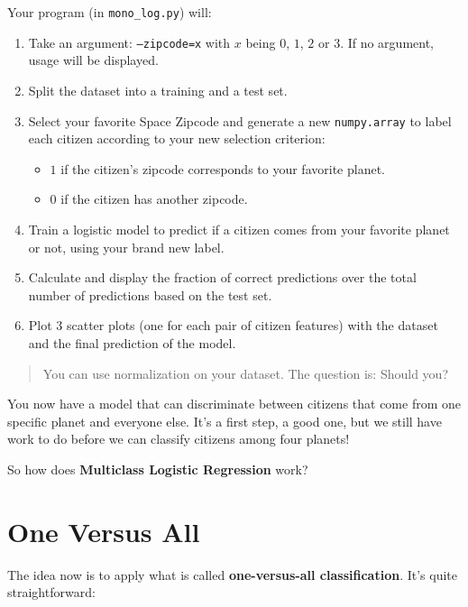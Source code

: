 \documentclass{42-en}
\begin{document}
Your program (in \texttt{mono\_log.py}) will:
\begin{enumerate}
  \item Take an argument: \texttt{--zipcode=x} with $x$ being $0$, $1$, $2$ or $3$.
        If no argument, usage will be displayed.
  \item Split the dataset into a training and a test set.
  \item Select your favorite Space Zipcode and generate a new \texttt{numpy.array} to label each citizen according to your new selection criterion:
  \begin{itemize}
    \item $1$ if the citizen's zipcode corresponds to your favorite planet.
    \item $0$ if the citizen has another zipcode.
  \end{itemize}
  \item Train a logistic model to predict if a citizen comes from your favorite planet or not, using your brand new label.
  \item Calculate and display the fraction of correct predictions over the total number of predictions based on the test set.
  \item Plot 3 scatter plots (one for each pair of citizen features) with the dataset and the final prediction of the model.
\end{enumerate}

\begin{quote}
  You can use normalization on your dataset. The question is: Should you?
\end{quote}

You now have a model that can discriminate between citizens that come from one specific planet and everyone else.
It's a first step, a good one, but we still have work to do before we can classify citizens among four planets!

So how does \textbf{Multiclass Logistic Regression} work?  

\section*{One Versus All}
The idea now is to apply what is called \textbf{one-versus-all classification}.
It's quite straightforward:
\end{document}
